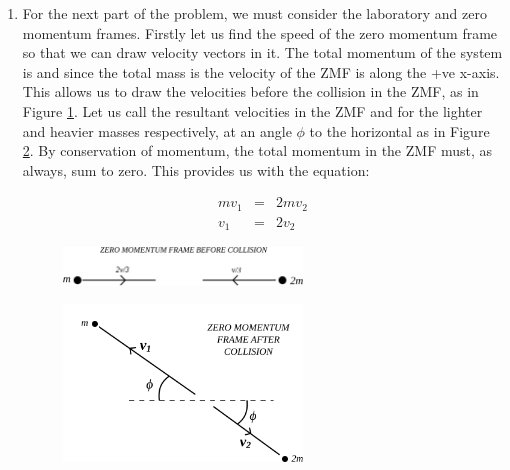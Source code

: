 \begin{problem}
{\begin{enumerate}
Therefore the final kinetic energy of the system is . The initial kinetic energy of the system is simply the sum of the two particles' energies:
\begin{equation*}
\frac{1}{2}m|\vtr{v}_{1}|^2+\frac{1}{2}m|\vtr{v}_{2}|^2
\end{equation*}

Therefore the amount of kinetic energy available for conversion to other forms of energy is:
\begin{equation*}
\frac{1}{2}m\left(|\vtr{v}_{1}|^2+|\vtr{v}_{2}|^2\right)-\frac{1}{4}m|\vtr{v}_{1}+\vtr{v}_{2}|^2
\end{equation*}
 which can be rewritten as .

\item For the next part of the problem, we must consider the laboratory and zero momentum frames. Firstly let us find the speed of the zero momentum frame so that we can draw velocity vectors in it. The total momentum of the system is  and since the total mass is  the velocity of the ZMF is  along the +ve x-axis. This allows us to draw the velocities before the collision in the ZMF, as in Figure \ref{fig:Tripos_Inelastic_ZMF_1}. Let us call the resultant velocities in the ZMF  and  for the lighter and heavier masses respectively, at an angle $\phi$ to the horizontal as in Figure \ref{fig:Tripos_Inelastic_ZMF_2}. By conservation of momentum, the total momentum in the ZMF must, as always, sum to zero. This provides us with the equation:

\begin{eqnarray}
mv_1 &=& 2mv_2 \nonumber \\
v_1 &=& 2v_2
\end{eqnarray}


\begin{figure}[h]
	\centering
	\includegraphics[width=0.6\textwidth]{../../../figures/Tripos_Inelastic_ZMF_1.svg}
	\caption{}\label{fig:Tripos_Inelastic_ZMF_1}
\end{figure}

\begin{figure}[h]
	\centering
	\includegraphics[width=0.6\textwidth]{../../../figures/Tripos_Inelastic_ZMF_2.svg}
	\caption{}\label{fig:Tripos_Inelastic_ZMF_2}
\end{figure}



\end{enumerate}}
\end{problem}
